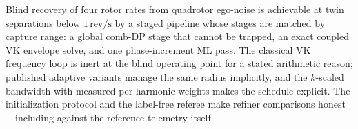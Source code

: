 \documentclass[journal]{IEEEtran}
\newcommand{\revps}{\ensuremath{\,\mathrm{rev/s}}}
\begin{document}
Blind recovery of four rotor rates from quadrotor ego-noise is achievable
at twin separations below $1\revps$ by a staged pipeline whose stages are
matched by capture range: a global comb-DP stage that cannot be trapped,
an exact coupled VK envelope solve, and one phase-increment ML pass. The
classical VK frequency loop is inert at the blind operating point for a
stated arithmetic reason; published adaptive variants manage the same
radius implicitly, and the $k$-scaled bandwidth with measured
per-harmonic weights makes the schedule explicit. The initialization
protocol and the label-free referee make refiner comparisons
honest---including against the reference telemetry itself.



\end{document}
